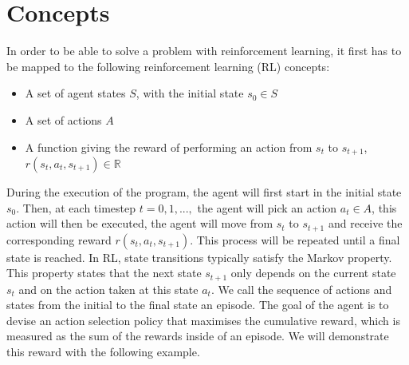 \section{Concepts}
In order to be able to solve a problem with reinforcement learning, it first has to be mapped to the following reinforcement learning (RL) concepts:
\begin{itemize}
	\item A set of agent states $S$, with the initial state $s_0\in S$
	\item A set of actions $A$
	\item A function giving the reward of performing an action from  $s_t$ to $s_{t+1}$, $r(s_t,a_t,s_{t+1})\in \mathbb{R}$
\end{itemize}
During the execution of the program, the agent will first start in the initial state $s_0$. Then, at each timestep $t=0,1,...,$ the agent will pick an action $a_t \in A$, this action will then be executed, the agent will move from $s_t$ to $s_{t+1}$ and receive the corresponding reward $r(s_t,a_t,s_{t+1})$. This process will be repeated until a final state is reached. In RL, state transitions typically satisfy the Markov property. This property states that the next state $s_{t+1}$ only depends on the current state $s_t$ and on the action taken at this state $a_t$. We call the sequence of actions and states from the initial to the final state an episode. The goal of the agent is to devise an action selection policy that maximises the cumulative reward, which is measured as the sum of the rewards inside of an episode. We will demonstrate this reward with the following example.
